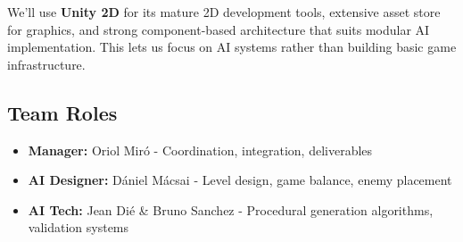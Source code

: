 \documentclass[11pt]{article}
\begin{document}
We'll use \textbf{Unity 2D} for its mature 2D development tools, extensive asset store for graphics, and strong component-based architecture that suits modular AI implementation. This lets us focus on AI systems rather than building basic game infrastructure.

\subsection{Team Roles}
\begin{itemize}
    \item \textbf{Manager:} Oriol Miró - Coordination, integration, deliverables
    \item \textbf{AI Designer:} Dániel Mácsai - Level design, game balance, enemy placement
    \item \textbf{AI Tech:} Jean Dié \& Bruno Sanchez - Procedural generation algorithms, validation systems
\end{itemize}
\end{document}
